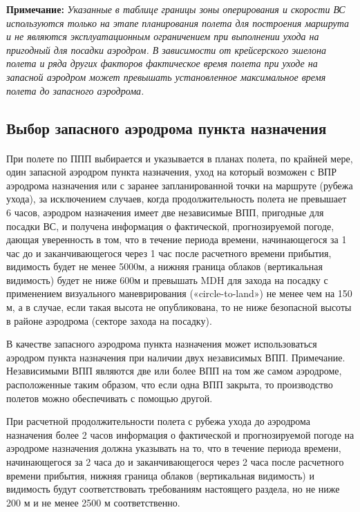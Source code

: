 \textbf{Примечание:} \textit{Указанные в таблице границы зоны оперирования и скорости ВС используются только на этапе планирования полета для построения маршрута и не являются эксплуатационным ограничением при выполнении ухода на пригодный для посадки аэродром. В зависимости от крейсерского эшелона полета и ряда других факторов фактическое время полета при уходе на запасной аэродром может превышать установленное максимальное время полета до запасного аэродрома.}

\subsection{Выбор запасного аэродрома пункта назначения}\label{sect:alt}

\paragraph{} При полете по ППП выбирается и указывается в планах полета, по крайней мере, один запасной аэродром пункта назначения, уход на который возможен с ВПР аэродрома назначения или с заранее запланированной точки на маршруте (рубежа ухода), за исключением случаев, когда продолжительность полета не превышает 6 часов, аэродром назначения имеет две независимые ВПП, пригодные для посадки ВС, и получена информация о фактической, прогнозируемой погоде, дающая уверенность в том, что в течение периода времени, начинающегося за 1 час до и заканчивающегося через 1 час после расчетного времени прибытия, видимость будет не менее 5000м, а нижняя граница облаков (вертикальная видимость) будет не ниже 600м и превышать MDH для захода на посадку с применением визуального маневрирования («circle-to-land») не менее чем на 150 м, а в случае, если такая высота не опубликована, то не ниже безопасной высоты в районе аэродрома (секторе захода на посадку).

В качестве запасного аэродрома пункта назначения может использоваться аэродром пункта назначения при наличии двух независимых ВПП.
Примечание. Независимыми ВПП являются две или более ВПП на том же самом аэродроме, расположенные таким образом, что если одна ВПП закрыта, то производство полетов можно обеспечивать с помощью другой.

При расчетной продолжительности полета с рубежа ухода до аэродрома назначения более 2 часов информация о фактической и прогнозируемой погоде на аэродроме назначения должна указывать на то, что в течение периода времени, начинающегося за 2 часа до и заканчивающегося через 2 часа после расчетного времени прибытия, нижняя граница облаков (вертикальная видимость) и видимость будут соответствовать требованиям настоящего раздела, но не ниже 200 м и не менее 2500 м соответственно.

